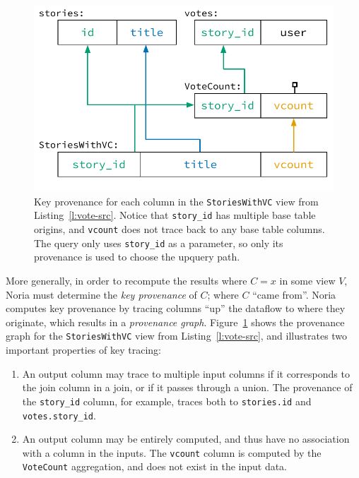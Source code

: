\begin{figure}[t]
  \centering
  \includegraphics{diagrams/Key Provenance.pdf}
  \caption{Key provenance for each column in the \texttt{StoriesWithVC} view
  from Listing~\ref{l:vote-src}. Notice that \texttt{\color{set3}story\_id} has
  multiple base table origins, and \texttt{\color{set2}vcount} does not trace
  back to any base table columns. The query only uses
  \texttt{\color{set3}story\_id} as a parameter, so only its provenance is used
  to choose the upquery path.}
  \label{f:key-prov}
\end{figure}

More generally, in order to recompute the results where $C = x$ in some view
$V$, Noria must determine the \textit{key provenance} of $C$; where $C$ ``came
from''. Noria computes key provenance by tracing columns ``up'' the dataflow to
where they originate, which results in a \textit{provenance graph}.
Figure~\ref{f:key-prov} shows the provenance graph for the
\texttt{StoriesWithVC} view from Listing~\vref{l:vote-src}, and illustrates two
important properties of key tracing:

\begin{enumerate}
  \item An output column may trace to multiple input columns if it corresponds
    to the join column in a join, or if it passes through a union. The
    provenance of the \texttt{story\_id} column, for example, traces both to
    \texttt{stories.id} and \texttt{votes.story\_id}.
  \item An output column may be entirely computed, and thus have no association
    with a column in the inputs. The \texttt{vcount} column is computed by the
    \texttt{VoteCount} aggregation, and does not exist in the input data.
\end{enumerate}

